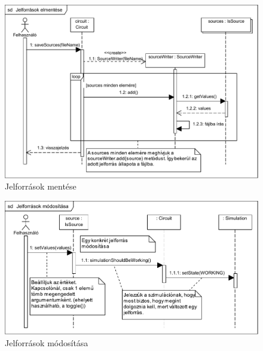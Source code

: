 \begin{figure}[H]
\begin{center}
\includegraphics[width=17cm]{chapters/chapter03/seqdiagrams/jelforrasok_mentese.pdf}
\caption{Jelforrások mentése}
\label{fig:jelforrasok_mentese}
\end{center}
\end{figure}

\begin{figure}[H]
\begin{center}
\includegraphics{chapters/chapter03/seqdiagrams/jelforrasok_modositasa.pdf}
\caption{Jelforrások módosítása}
\label{fig:jelforrasok_modositasa}
\end{center}
\end{figure}

